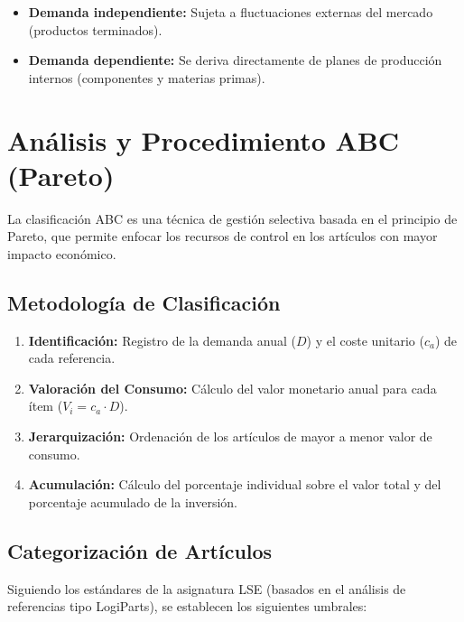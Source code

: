 \documentclass[11pt,a4paper]{article}
\begin{document}
\begin{itemize}
    \item \textbf{Demanda independiente:} Sujeta a fluctuaciones externas del mercado (productos terminados).
    \item \textbf{Demanda dependiente:} Se deriva directamente de planes de producción internos (componentes y materias primas).

\end{itemize}
\section{Análisis y Procedimiento ABC (Pareto)}

La clasificación ABC es una técnica de gestión selectiva basada en el principio de Pareto, que permite enfocar los recursos de control en los artículos con mayor impacto económico.

\subsection{Metodología de Clasificación}

\begin{enumerate}
    \item \textbf{Identificación:} Registro de la demanda anual ($D$) y el coste unitario ($c_a$) de cada referencia.
    \item \textbf{Valoración del Consumo:} Cálculo del valor monetario anual para cada ítem ($V_i = c_a \cdot D$).
    \item \textbf{Jerarquización:} Ordenación de los artículos de mayor a menor valor de consumo.
    \item \textbf{Acumulación:} Cálculo del porcentaje individual sobre el valor total y del porcentaje acumulado de la inversión.

\end{enumerate}
\subsection{Categorización de Artículos}

Siguiendo los estándares de la asignatura LSE (basados en el análisis de referencias tipo LogiParts), se establecen los siguientes umbrales:
\end{document}
